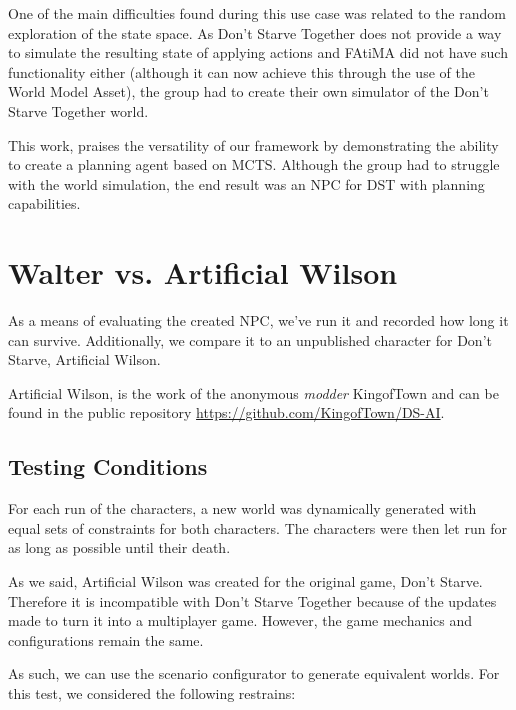 One of the main difficulties found during this use case was related to the random exploration of the state space.
As Don't Starve Together does not provide a way to simulate the resulting state of applying actions and \ac{FAtiMA} did not have such functionality either (although it can now achieve this through the use of the World Model Asset), the group had to create their own simulator of the Don't Starve Together world.

This work, praises the versatility of our framework by demonstrating the ability to create a planning agent based on \ac{MCTS}.
Although the group had to struggle with the world simulation, the end result was an \ac{NPC} for \ac{DST} with planning capabilities.

\section{Walter vs. Artificial Wilson}

\noindent As a means of evaluating the created \ac{NPC}, we've run it and recorded how long it can survive.
Additionally, we compare it to an unpublished character for Don't Starve, Artificial Wilson.

Artificial Wilson, is the work of the anonymous \textit{modder} KingofTown and can be found in the public repository \href{https://github.com/KingofTown/DS-AI}{https://github.com/KingofTown/DS-AI}.

\subsection{Testing Conditions}

\noindent For each run of the characters, a new world was dynamically generated with equal sets of constraints for both characters.
The characters were then let run for as long as possible until their death.

As we said, Artificial Wilson was created for the original game, Don't Starve.
Therefore it is incompatible with Don't Starve Together because of the updates made to turn it into a multiplayer game.
However, the game mechanics and configurations remain the same.

As such, we can use the scenario configurator to generate equivalent worlds.
For this test, we considered the following restrains:

